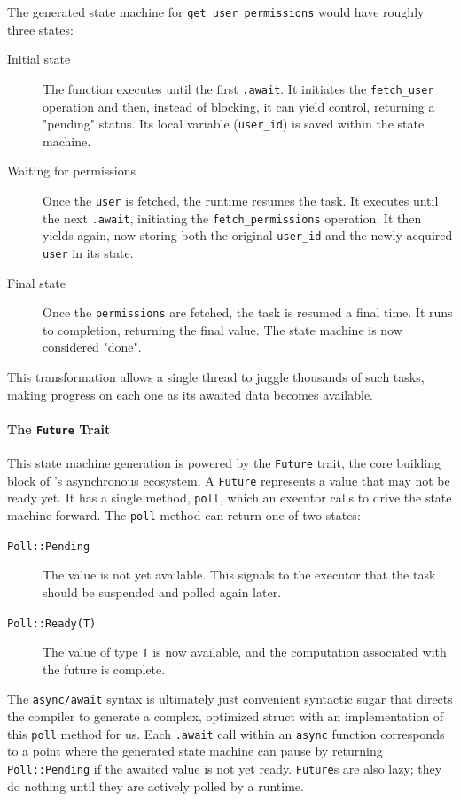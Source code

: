 The generated state machine for \texttt{get\_user\_permissions} would have roughly three
states:
\begin{description}
    \item[Initial state] The function executes until the first \texttt{.await}.
          It initiates the \texttt{fetch\_user} operation and then, instead of
          blocking, it can yield control, returning a "pending" status. Its local variable
          (\texttt{user\_id}) is saved within the state machine.
    \item[Waiting for permissions] Once the \texttt{user} is fetched, the runtime
          resumes the task. It executes until the next \texttt{.await}, initiating the
          \texttt{fetch\_permissions} operation. It then yields again, now storing both
          the original \texttt{user\_id} and the newly acquired \texttt{user} in its state.
    \item[Final state] Once the \texttt{permissions} are fetched, the task is
          resumed a final time. It runs to completion, returning the final value. The state
          machine is now considered "done".
\end{description}
This transformation allows a single thread to juggle thousands of such tasks, making
progress on each one as its awaited data becomes available.

\paragraph{The \texttt{Future} Trait}
This state machine generation is powered by the \texttt{Future} trait, the core building
block of \Rust's asynchronous ecosystem. A \texttt{Future} represents a value that may not
be ready yet. It has a single method, \texttt{poll}, which an executor calls to drive the
state machine forward. The \texttt{poll} method can return one of two states:
\begin{description}
    \item[\texttt{Poll::Pending}] The value is not yet available. This signals to the
          executor that the task should be suspended and polled again later.
    \item[\texttt{Poll::Ready(T)}] The value of type \texttt{T} is now available, and the
          computation associated with the future is complete.
\end{description}
The \texttt{async/await} syntax is ultimately just convenient syntactic sugar that directs
the compiler to generate a complex, optimized struct with an implementation of this
\texttt{poll} method for us. Each \texttt{.await} call within an \texttt{async} function
corresponds to a point where the generated state machine can pause by returning
\texttt{Poll::Pending} if the awaited value is not yet ready. \texttt{Future}s are also
lazy; they do nothing until they are actively polled by a runtime.

